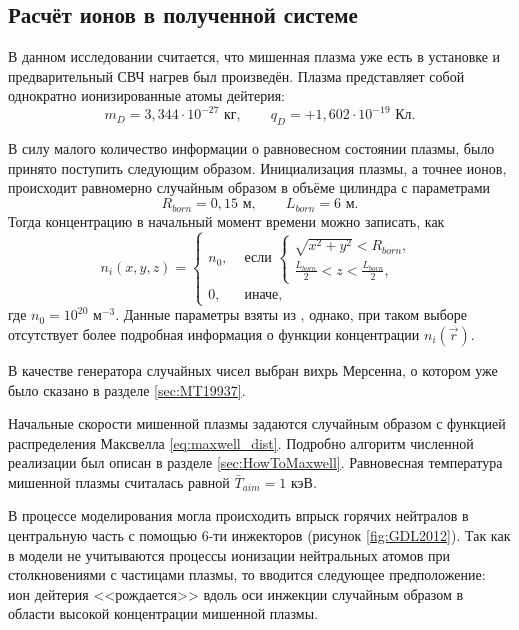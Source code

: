 \subsection{Расчёт ионов в полученной системе}

В данном исследовании считается, что мишенная плазма уже есть в установке и предварительный СВЧ нагрев был произведён. Плазма представляет собой однократно ионизированные атомы дейтерия:
\begin{equation}
	m_D = 3,344\cdot10^{-27} \text{ кг}, \qquad q_D = + 1,602 \cdot 10^{-19} \text{ Кл}.
\end{equation}

В силу малого количество информации о равновесном состоянии плазмы, было принято поступить следующим образом. Инициализация плазмы, а точнее ионов, происходит равномерно случайным образом в объёме цилиндра с параметрами
\begin{equation}
	R_{born} = 0,15 \text{ м}, \qquad L_{born} = 6 \text{ м}.
\end{equation} 
Тогда концентрацию в начальный момент времени можно записать, как
\begin{equation}
	n_i(x,y,z) = 
	\begin{cases}
		n_0, & \text{ если }\begin{cases}
		\sqrt{x^2 + y^2} < R_{born}, \\
		\frac{L_{born}}{2} < z < \frac{L_{born}}{2},
		\end{cases} \\
		0,   & \text{ иначе},
	\end{cases}
\end{equation}
где $n_0 = 10^{20} \text{ м}^{-3}$.
Данные параметры взяты из \cite{anikeev2012}, однако, при таком выборе отсутствует более подробная информация о функции концентрации $n_i(\vec{r})$. 

В качестве генератора случайных чисел выбран вихрь Мерсенна, о котором уже было сказано в разделе \ref{sec:MT19937}.

Начальные скорости мишенной плазмы задаются случайным образом с функцией распределения Максвелла \eqref{eq:maxwell_dist}. Подробно алгоритм численной реализации был описан в разделе \ref{sec:HowToMaxwell}.
Равновесная температура мишенной плазмы считалась равной $\bar{T}_{aim} = 1 \text{ кэВ}$.

В процессе моделирования могла происходить впрыск горячих нейтралов в центральную часть с помощью 6-ти инжекторов (рисунок \ref{fig:GDL2012}). Так как в модели не учитываются процессы ионизации нейтральных атомов при столкновениями с частицами плазмы, то вводится следующее предположение: ион дейтерия <<рождается>> вдоль оси инжекции случайным образом в области высокой концентрации мишенной плазмы.

